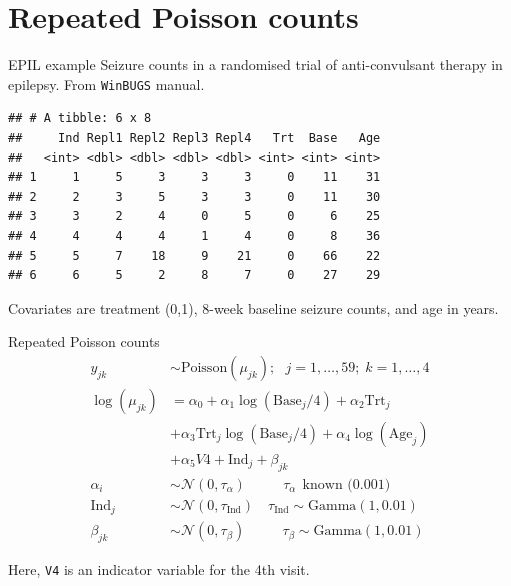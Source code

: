\documentclass[
  ignorenonframetext,
]{beamer}
\begin{document}
\hypertarget{repeated-poisson-counts}{%
\section{Repeated Poisson counts}\label{repeated-poisson-counts}}

\begin{frame}[fragile]{EPIL example}
\protect\hypertarget{epil-example}{}
Seizure counts in a randomised trial of anti-convulsant therapy in
epilepsy. From \texttt{WinBUGS} manual. \small

\begin{verbatim}
## # A tibble: 6 x 8
##     Ind Repl1 Repl2 Repl3 Repl4   Trt  Base   Age
##   <int> <dbl> <dbl> <dbl> <dbl> <int> <int> <int>
## 1     1     5     3     3     3     0    11    31
## 2     2     3     5     3     3     0    11    30
## 3     3     2     4     0     5     0     6    25
## 4     4     4     4     1     4     0     8    36
## 5     5     7    18     9    21     0    66    22
## 6     6     5     2     8     7     0    27    29
\end{verbatim}

\normalsize

Covariates are treatment (0,1), 8-week baseline seizure counts, and age
in years.
\end{frame}

\begin{frame}[fragile]{Repeated Poisson counts}
\protect\hypertarget{repeated-poisson-counts-1}{}
\[
\begin{aligned}
  y_{jk} & \sim  \text{Poisson}(\mu_{jk});\mbox{  }
        j=1,\dots,59;\; k=1,\dots,4\\
  \log(\mu_{jk})  &= \alpha_0 + \alpha_1
        \log(\text{Base}_j / 4) + \alpha_2\text{Trt}_j\\
    &+ \alpha_3\text{Trt}_j \log(\text{Base}_j / 4) +
        \alpha_4\log(\text{Age}_j) \\
        &+ \alpha_5 V4 + \text{Ind}_j + \beta_{jk}\\
        \alpha_i & \sim  \mathcal{N}(0, \tau_{\alpha})\mbox{   }
        \qquad\tau_{\alpha}\ \  \text{known (0.001)}\\
        \text{Ind}_j & \sim  \mathcal{N}(0, \tau_{\text{Ind}})\quad\tau_{\text{Ind}}\sim\text{Gamma}(1, 0.01)\\
        \beta_{jk} & \sim  \mathcal{N}(0, \tau_{\beta})\mbox{   }
        \qquad\tau_{\beta}\sim\text{Gamma}(1, 0.01)
\end{aligned}
\]

Here, \texttt{V4} is an indicator variable for the 4th visit.
\end{frame}
\end{document}
